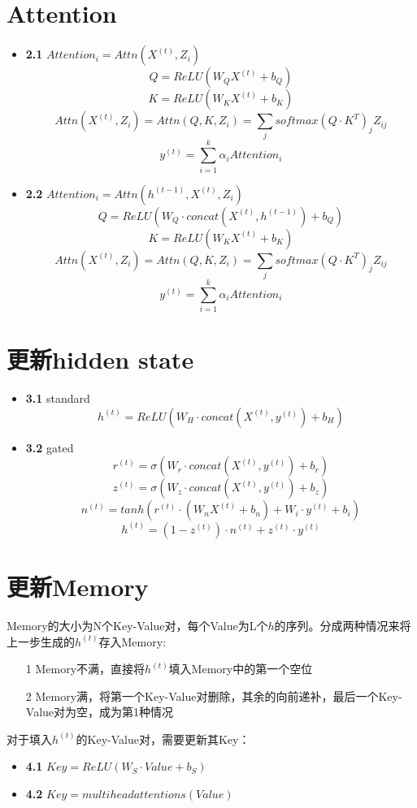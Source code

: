 \documentclass{article}
\begin{document}
\section{Attention}
	\begin{itemize}
		\item \textbf{2.1} $Attention_i = Attn(X^{(t)}, Z_i)$
			$$Q = ReLU(W_QX^{(t)} + b_Q)$$
			$$K = ReLU(W_KX^{(t)} + b_K)$$
			$$Attn(X^{(t)}, Z_i) = Attn(Q, K, Z_i)  = \sum_j softmax(Q\cdot K^T)_jZ_{ij}$$
			$$y^{(t)} = \sum_{i=1}^k \alpha_i Attention_i$$
		\item \textbf{2.2} $Attention_i = Attn(h^{(t-1)},X^{(t)}, Z_i)$
			$$Q = ReLU(W_Q\cdot concat(X^{(t)}, h^{(t-1)}) + b_Q)$$
			$$K = ReLU(W_KX^{(t)} + b_K)$$
			$$Attn(X^{(t)}, Z_i) = Attn(Q, K, Z_i)  = \sum_j softmax(Q\cdot K^T)_jZ_{ij}$$
			$$y^{(t)} = \sum_{i=1}^k \alpha_i Attention_i$$
	\end{itemize}
\section{更新hidden state}
	\begin{itemize}
		\item \textbf{3.1} standard
			$$h^{(t)} = ReLU(W_H\cdot concat(X^{(t)}, y^{(t)}) + b_H)$$
		\item \textbf{3.2} gated
			$$ r^{(t)} = \sigma(W_r \cdot concat(X^{(t)}, y^{(t)}) + b_r) $$
			$$ z^{(t)} = \sigma(W_z \cdot concat(X^{(t)}, y^{(t)}) + b_z) $$
			$$ n^{(t)} = tanh(r^{(t)} \cdot (W_nX^{(t)} + b_n) + W_i \cdot y^{(t)} + b_i) $$
			$$ h^{(t)} = (1 - z^{(t)})\cdot n^{(t)} + z^{(t)} \cdot y^{(t)}$$
	\end{itemize}
\section{更新Memory}
	Memory的大小为N个Key-Value对，每个Value为L个$h$的序列。分成两种情况来将上一步生成的$h^{(t)}$存入Memory:
	\begin{itemize}
		\item[1] Memory不满，直接将$h^{(t)}$填入Memory中的第一个空位
		\item[2] Memory满，将第一个Key-Value对删除，其余的向前递补，最后一个Key-Value对为空，成为第1种情况
	\end{itemize}
	对于填入$h^{(t)}$的Key-Value对，需要更新其Key：
	\begin{itemize}
		\item \textbf{4.1} $Key = ReLU(W_S\cdot Value + b_S)$
		\item \textbf{4.2} $Key = multiheadattentions(Value)$
	\end{itemize}


\end{document}
